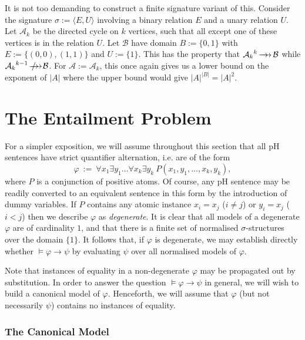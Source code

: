 \documentclass{LMCS}
\newcommand{\surhom}{
  \ensuremath{
      \negthinspace 
      \longrightarrow
      \hspace{-5mm} \rightarrow \hspace{1mm}
  }
}
\newcommand{\nosurhom}{
  \ensuremath{
      \negthinspace 
      \longrightarrow
      \hspace{-5mm} \rightarrow \hspace{-4mm} / \hspace{3mm}
  }
}
\begin{document}
It is not too demanding to construct a finite signature variant of this. Consider the signature $\sigma:=\langle E,U\rangle$ involving a binary relation $E$ and a unary relation $U$. Let $\mathcal{A}_k$ be the directed cycle on $k$ vertices, such that all except one of these vertices is in the relation $U$. Let $\mathcal{B}$ have domain $B:=\{0,1\}$ with $E:=\{(0,0),(1,1)\}$ and $U:=\{1\}$. This has the property that ${\mathcal{A}_k}^{k} \surhom \mathcal{B}$ while ${\mathcal{A}_k}^{k-1} \nosurhom \mathcal{B}$. For $\mathcal{A}:=\mathcal{A}_k$, this once again gives us a lower bound on the exponent of $|A|$ where the upper bound would give $|A|^{|B|}=|A|^2$.

\section{The Entailment Problem}
\label{sec:LHS}

For a simpler exposition, we will assume throughout this section that all pH sentences have strict quantifier alternation, i.e. are of the form
\[\varphi \ := \ \forall x_1 \exists y_1 \ldots \forall x_k \exists y_k \ P(x_1,y_1,\ldots,x_k,y_k), \]
where $P$ is a conjunction of positive atoms. Of course, any pH sentence may be readily converted to an equivalent sentence in this form by the introduction of dummy variables. If $P$ contains any atomic instance $x_i=x_j$ ($i \neq j$) or $y_i=x_j$ ($i < j$) then we describe $\varphi$ as \emph{degenerate}. It is clear that all models of a degenerate $\varphi$ are of cardinality $1$, and that there is a finite set of normalised $\sigma$-structures over the domain $\{1\}$. It follows that, if $\varphi$ is degenerate, we may establish directly whether $\models \varphi \rightarrow \psi$ by evaluating $\psi$ over all normalised models of $\varphi$. 

Note that instances of equality in a non-degenerate $\varphi$ may be propagated out by substitution. In order to answer the question $\models \varphi \rightarrow \psi$ in general, we will wish to build a canonical model of $\varphi$. Henceforth, we will assume that $\varphi$ (but not necessarily $\psi$) contains no instances of equality.

\subsubsection*{The Canonical Model}
\end{document}
